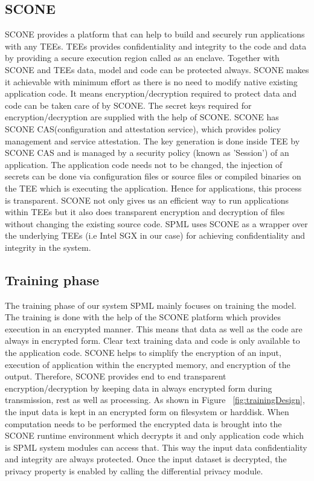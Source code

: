 \subsection{SCONE}
SCONE \cite{22} provides a platform that can help to build and securely run applications with any TEEs. TEEs provides confidentiality and integrity to the code and data by providing a secure execution region called as an enclave. Together with SCONE and TEEs data, model and code can be protected always. SCONE makes it achievable with minimum effort as there is no need to modify native existing application code. It means encryption/decryption required to protect data and code can be taken care of by SCONE. The secret keys required for encryption/decryption are supplied with the help of SCONE. SCONE has SCONE CAS(configuration and attestation service), which provides policy management and service attestation. The key generation is done inside TEE by SCONE CAS and is managed by a security policy (known as 'Session') of an application. The application code needs not to be changed, the injection of secrets can be done via configuration files or source files or compiled binaries on the TEE which is executing the application. Hence for applications, this process is transparent. SCONE not only gives us an efficient way to run applications within TEEs but it also does transparent encryption and decryption of files without changing the existing source code. SPML uses SCONE as a wrapper over the underlying TEEs (i.e Intel SGX in our case) for achieving confidentiality and integrity in the system.

\subsection{Training phase}
The training phase of our system SPML mainly focuses on training the model. The training is done with the help of the SCONE platform which provides execution in an encrypted manner. This means that data as well as the code are always in encrypted form. Clear text training data and code is only available to the application code. SCONE helps to simplify the encryption of an input, execution of application within the encrypted memory, and encryption of the output. Therefore, SCONE provides end to end transparent encryption/decryption by keeping data in always encrypted form during transmission, rest as well as processing. As shown in Figure ~\ref{fig:trainingDesign}, the input data is kept in an encrypted form on filesystem or harddisk. When computation needs to be performed the encrypted data is brought into the SCONE runtime environment which decrypts it and only application code which is SPML system modules can access that. This way the input data confidentiality and integrity are always protected.  Once the input dataset is decrypted, the privacy property is enabled by calling the differential privacy module.


